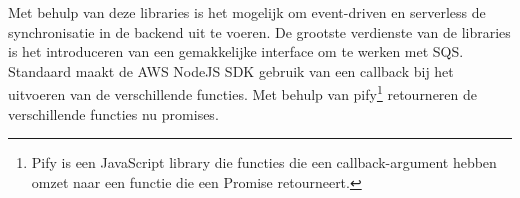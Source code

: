 Met behulp van deze libraries is het mogelijk om event-driven en serverless de synchronisatie in de backend uit te voeren. De grootste verdienste van de libraries is het introduceren van een gemakkelijke interface om te werken met SQS. Standaard maakt de AWS NodeJS SDK gebruik van een callback bij het uitvoeren van de verschillende functies. Met behulp van pify\footnote{Pify is een JavaScript library die functies die een callback-argument hebben omzet naar een functie die een Promise retourneert.} retourneren de verschillende functies nu promises.
